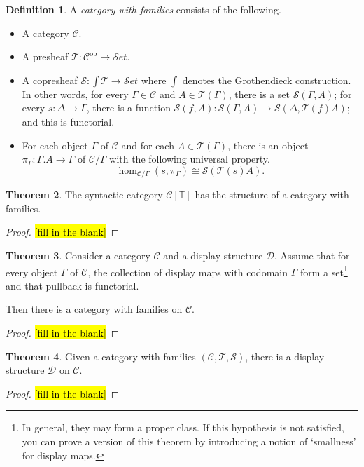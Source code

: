 \documentclass{article}
\theoremstyle{definition}
\newtheorem{definition}{Definition}[section]
\newtheorem{theorem}[definition]{Theorem}
\newcommand{\types}{\mathcal T}
\newcommand{\terms}{\mathcal S}
\newcommand{\T}{\mathbb T}
\newcommand{\C}{\mathcal C}
\newcommand{\D}{\mathcal D}
\newcommand{\Set}{{\mathcal S}et}
\newcommand{\syncat}[1]{\C [#1]}
\newcommand{\op}{\mathrm {op}}
\begin{document}
\begin{definition}
    A \emph{category with families} consists of the following.
    \begin{itemize}
        \item A category $\C$.
        \item A presheaf $\types : \C^\op \to \Set$.
        \item A copresheaf $\terms : \int \types \to \Set$ where $\int$ denotes the Grothendieck construction. In other words, for every $\Gamma \in \C$ and $A \in \types (\Gamma)$, there is a set $\terms (\Gamma, A)$; for every $s: \Delta \to \Gamma$, there is a function $\terms(f,A):  \terms (\Gamma, A) \to \terms (\Delta, \types(f)A)$; and this is functorial.
        \item For each object $\Gamma$ of $\C$ and for each $A \in \types(\Gamma)$, there is an object $\pi_\Gamma : \Gamma.A \to \Gamma $ of $\C / \Gamma$ with the following universal property.
                \[ \hom_{\C / \Gamma}(s, \pi_\Gamma) \cong \terms(\types(s) A). \]
    \end{itemize}
\end{definition}

\begin{theorem}
    The syntactic category $\syncat{\T}$ has the structure of a category with families.
\end{theorem}
\begin{proof}
    \hl{[fill in the blank]}
\end{proof}

\begin{theorem}
    Consider a category $\C$ and a display structure $\D$. Assume that for every object $\Gamma$ of $\C$, the collection of display maps with codomain $\Gamma$ form a set\footnote{In general, they may form a proper class. If this hypothesis is not satisfied, you can prove a version of this theorem by introducing a notion of `smallness' for display maps.} and that pullback is functorial.

    Then there is a category with families on $\C$.
\end{theorem}
\begin{proof}
    \hl{[fill in the blank]}
\end{proof}

\begin{theorem}
    Given a category with families $(\C, \types, \terms)$, there is a display structure $\D$ on $\C$.
\end{theorem}
\begin{proof}
    \hl{[fill in the blank]}
\end{proof}
\end{document}
